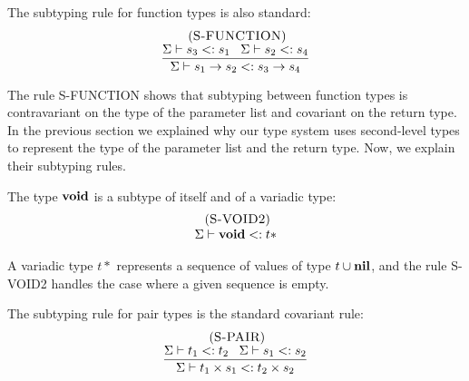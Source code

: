 The subtyping rule for function types is also standard:
\[
\begin{array}{c}
\; (\textsc{S-FUNCTION})\\
\dfrac{\Sigma \vdash s_{3} <: s_{1} \;\;\;
       \Sigma \vdash s_{2} <: s_{4}}
      {\Sigma \vdash s_{1} \rightarrow s_{2} <: s_{3} \rightarrow s_{4}}
\end{array}
\]

The rule \textsc{S-FUNCTION} shows that subtyping between
function types is contravariant on the type of the parameter list
and covariant on the return type.
In the previous section we explained why our type system uses
second-level types to represent the type of the parameter list
and the return type.
Now, we explain their subtyping rules.

The type $\mathbf{void}$ is a subtype of itself and of a variadic type:
\[
\begin{array}{c}
\; (\textsc{S-VOID2})\\
\Sigma \vdash \mathbf{void} <: t{*}
\end{array}
\]

A variadic type $t{*}$ represents a sequence of values of type
$t \cup \mathbf{nil}$, and the rule \textsc{S-VOID2} handles the case where
a given sequence is empty.

The subtyping rule for pair types is the standard covariant rule:
\[
\begin{array}{c}
\; (\textsc{S-PAIR})\\
\dfrac{\Sigma \vdash t_{1} <: t_{2} \;\;\;
       \Sigma \vdash s_{1} <: s_{2}}
      {\Sigma \vdash t_{1} \times s_{1} <: t_{2} \times s_{2}}
\end{array}
\]

